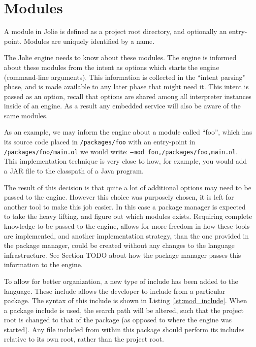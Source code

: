 \section{Modules}

A module in Jolie is defined as a project root directory, and optionally an
entry-point. Modules are uniquely identified by a name.

The Jolie engine needs to know about these modules. The engine is informed
about these modules from the intent as options which starts the engine
(command-line arguments). This information is collected in the ``intent
parsing'' phase, and is made available to any later phase that might need it.
This intent is passed as an option, recall that options are shared among all
interpreter instances inside of an engine. As a result any embedded service
will also be aware of the same modules.

As an example, we may inform the engine about a module called ``foo'', which
has its source code placed in \verb!/packages/foo!  with an entry-point in
\verb!/packages/foo/main.ol! we would write: \texttt{--mod
foo,/packages/foo,main.ol}. This implementation technique is very close to
how, for example, you would add a JAR file to the classpath of a Java program.

The result of this decision is that quite a lot of additional options may need
to be passed to the engine. However this choice was purposely chosen, it
is left for another tool to make this job easier. In this case a package
manager is expected to take the heavy lifting, and figure out which modules
exists. Requiring complete knowledge to be passed to the engine, allows
for more freedom in how these tools are implemented, and another implementation
strategy, than the one provided in the package manager, could be created
without any changes to the language infrastructure. See Section TODO about how
the package manager passes this information to the engine.

To allow for better organization, a new type of include has been added to the
language. These include allows the developer to include from a particular
package. The syntax of this include is shown in Listing \ref{lst:mod_include}.
When a package include is used, the search path will be altered, such that the
project root is changed to that of the package (as opposed to where the engine
was started). Any file included from within this package should perform its
includes relative to its own root, rather than the project root.

